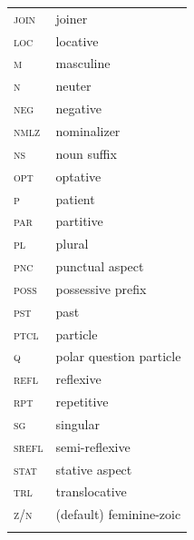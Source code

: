 \documentclass[output=paper,colorlinks,citecolor=brown]{langscibook}
\begin{document}
\begin{tabularx}{.45\textwidth}{lQ}
\textsc{join} & joiner \\
\textsc{loc} & locative \\
\textsc{m} &  masculine \\
\textsc{n} & neuter \\
\textsc{neg} & negative \\
\textsc{nmlz} & nominalizer \\ 
\textsc{ns} &  noun suffix \\
\textsc{opt} & optative\\
\textsc{p} & patient \\
\textsc{par} &  partitive \\
\textsc{pl} & plural \\
\textsc{pnc} & punctual aspect \\
\textsc{poss} & possessive prefix \\
\textsc{pst} & past \\ 
\textsc{ptcl} &  particle \\
\textsc{q} & polar question particle \\
\textsc{refl} & reflexive \\
\textsc{rpt}  & repetitive \\
\textsc{sg} & singular \\
\textsc{srefl} &  semi-reflexive \\
\textsc{stat} & stative aspect \\
\textsc{trl} & translocative \\
\textsc{z/n} & (default) feminine-zoic\\
\\
\end{tabularx}


\sloppy
\largerpage
\printbibliography[heading=subbibliography,notkeyword=this]
\end{document}
